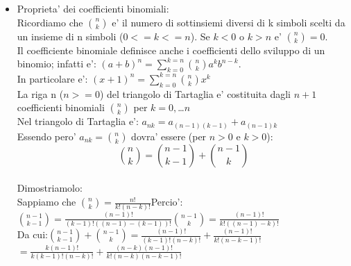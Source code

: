 \documentclass[12pt,a4paper]{article}
\begin{document}
\begin{flushleft}
\begin{itemize}
\item{
Proprieta' dei coefficienti binomiali:\\
\vspace{5mm}
Ricordiamo che $\binom{n}{k}$ e' il numero di sottinsiemi diversi di k simboli scelti da un insieme di n simboli ($0<=k<=n$). Se $k<0$ o $k>n$ e' $\binom{n}{k} = 0$.\\
\vspace{5mm}
Il coefficiente binomiale definisce anche i coefficienti dello sviluppo di un binomio; infatti e': \hspace{5mm}$(a+b)^n=\sum_{k=0}^{k=n}{\binom{n}{k}a^{k}b^{n-k}}$.\\
\vspace{5mm}
In particolare e': $(x+1)^n=\sum_{k=0}^{k=n}{\binom{n}{k}x^{k}}$\\
\vspace{5mm}
La riga n ($n>=0$) del triangolo di Tartaglia e' costituita dagli $n+1$ coefficienti binomiali $\binom{n}{k}$ per $k=0,$\dots$n$\\
\vspace{5mm}
Nel triangolo di Tartaglia e': $a_{nk}=a_{(n-1)(k-1)}+a_{(n-1)k}$\\
\vspace{5mm}
Essendo pero' $a_{nk}=\binom{n}{k}$ dovra' essere (per $n>0$ e $k>0$):\\
\begin{equation}
\label{eq:ind2}
\binom{n}{k}=\binom{n-1}{k-1}+\binom{n-1}{k}
\end{equation}
\\
\vspace{5mm}
Dimostriamolo:\\
\vspace{5mm}
Sappiamo che $\binom{n}{k}=\frac{n!}{k!(n-k)!}$\hspace{5mm}Percio':\\
\vspace{5mm}
$\binom{n-1}{k-1}=\frac{(n-1)!}{(k-1)!((n-1)-(k-1))!}$\hspace{15mm}$\binom{n-1}{k}=\frac{(n-1)!}{k!((n-1)-k)!}$\\
\vspace{5mm}
Da cui:\hspace{15mm}$\binom{n-1}{k-1}+\binom{n-1}{k} = \frac{(n-1)!}{(k-1)!(n-k)!} + \frac{(n-1)!}{k!(n-k-1)!}$\\
\vspace{5mm}
\hspace{53.3mm}$=\frac{k(n-1)!}{k(k-1)!(n-k)!} + \frac{(n-k)(n-1)!}{k!(n-k)(n-k-1)!}$\\
}
\end{itemize}
\end{flushleft}
\end{document}
